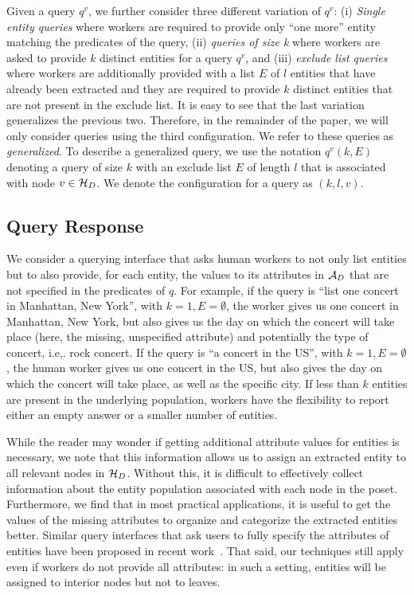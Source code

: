 Given a query $q^v$, we further consider three different variation of $q^v$: (i) {\em Single entity queries} where workers are required to provide only ``one more'' entity matching the predicates of the query, (ii) {\em queries of size k} where workers are asked to provide $k$ distinct entities for a query $q^v$, and (iii) {\em exclude list queries} where workers are additionally provided with a list $E$ of $l$ entities that have already been extracted and they are required to provide $k$ distinct entities that are not present in the exclude list. It is easy to see that the last variation generalizes the previous two. Therefore, in the remainder of the paper, we will only consider queries using the third configuration. We refer to these queries as {\em generalized}. To describe a generalized query, we use the notation $q^v(k,E)$ denoting a query of size $k$ with an exclude list $E$ of length $l$ that is associated with node $v \in \mathcal{H}_D$. We denote the configuration for a query as $(k,l,v)$. 

\subsection{Query Response} 
We consider a querying interface that asks human workers to not only list entities but to also provide, for each entity, the values to its attributes in $\mathcal{A}_D$ that are not specified in the predicates of $q$. For example, if the query is ``list one concert in Manhattan, New York'', with $k = 1, E = \emptyset$, the worker gives us one concert in Manhattan, New York, but also gives us the day on which the concert will take place (here, the missing, unspecified attribute) and potentially the type of concert, i.e,. rock concert. If the query is ``a concert in the US'', with $k = 1, E = \emptyset$, the human worker gives us one concert in the US, but also gives the day on which the concert will take place, as well as the specific city. If less than $k$ entities are present in the underlying population, workers have the flexibility to report either an empty answer or a smaller number of entities.

While the reader may wonder if getting additional attribute values for entities is necessary, we note that this information allows us to assign an extracted entity to all relevant nodes in $\mathcal{H}_D$. Without this, it is difficult to effectively collect information about the entity population associated with each node in the poset. Furthermore, we find that in most practical applications, it is useful to get the values of the missing attributes to organize and categorize the extracted entities better. Similar query interfaces that ask users to fully specify the attributes of entities have been proposed in recent work~\cite{quinn:2014}.  That said, our techniques still apply even if workers do not provide
all attributes: in such a setting, entities will be assigned to interior nodes but not to leaves.

